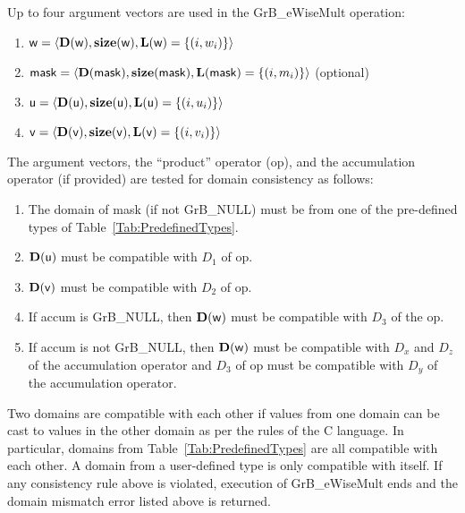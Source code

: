 Up to four argument vectors are used in the {\sf GrB\_eWiseMult} operation:
\begin{enumerate}
	\item ${\sf w} = \langle \bold{D}({\sf w}),\bold{size}({\sf w}),\bold{L}({\sf w}) = \{(i,w_i) \} \rangle$
	\item ${\sf mask} = \langle \bold{D}({\sf mask}),\bold{size}({\sf mask}),\bold{L}({\sf mask}) = \{(i,m_i) \} \rangle$ (optional)
	\item ${\sf u} = \langle \bold{D}({\sf u}),\bold{size}({\sf u}),\bold{L}({\sf u}) = \{(i,u_i) \} \rangle$
	\item ${\sf v} = \langle \bold{D}({\sf v}),\bold{size}({\sf v}),\bold{L}({\sf v}) = \{(i,v_i) \} \rangle$
\end{enumerate}

The argument vectors, the ``product'' operator ({\sf op}), and the accumulation 
operator (if provided) are tested for domain consistency as follows:
\begin{enumerate}
	\item The domain of {\sf mask} (if not {\sf GrB\_NULL}) must be from one of the pre-defined types of Table~\ref{Tab:PredefinedTypes}.

	\item $\bold{D}({\sf u})$ must be compatible with $D_1$ of {\sf op}.

	\item $\bold{D}({\sf v})$ must be compatible with $D_2$ of {\sf op}.

	\item If {\sf accum} is {\sf GrB\_NULL}, then $\bold{D}({\sf w})$ must be 
    compatible with $D_3$ of the {\sf op}.

	\item If {\sf accum} is not {\sf GrB\_NULL}, then $\bold{D}({\sf w})$ must be
    compatible with $D_x$ and $D_z$ of the accumulation operator and $D_3$ of
    {\sf op} must be compatible with $D_y$ of the accumulation operator.
\end{enumerate}
Two domains are compatible with each other if values from one domain can be cast 
to values in the other domain as per the rules of the C language.
In particular, domains from Table~\ref{Tab:PredefinedTypes} are all compatible 
with each other. A domain from a user-defined type is only compatible with itself.
If any consistency rule above is violated, execution of {\sf GrB\_eWiseMult} ends
and the domain mismatch error listed above is returned.


